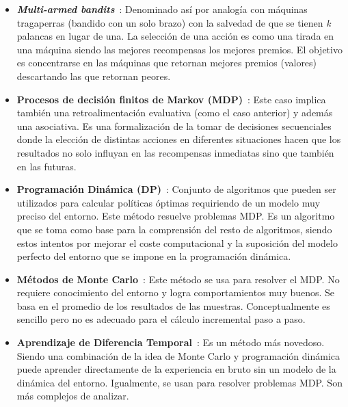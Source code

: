 \begin{itemize}
    \item \textbf{\textit{Multi-armed bandits}}~\cite{multi_armed}: Denominado así por analogía con máquinas tragaperras (bandido con un solo brazo) con la salvedad de que se tienen \textit{k} palancas en lugar de una. La selección de una acción es como una tirada en una máquina siendo las mejores recompensas los mejores premios. El objetivo es concentrarse en las máquinas que retornan mejores premios (valores) descartando las que retornan peores.\\
    
    \item \textbf{Procesos de decisión finitos de Markov (MDP)}~\cite{markov_decision_process}: Este caso implica también una retroalimentación evaluativa (como el caso anterior) y además una asociativa. Es una formalización de la tomar de decisiones secuenciales donde la elección de distintas acciones en diferentes situaciones hacen que los resultados no solo influyan en las recompensas inmediatas sino que también en las futuras.\\

    \item \textbf{Programación Dinámica (DP)}~\cite{dynamic_programming}: Conjunto de algoritmos que pueden ser utilizados para calcular políticas óptimas requiriendo de un modelo muy preciso del entorno. Este método resuelve problemas MDP. Es un algoritmo que se toma como base para la comprensión del resto de algoritmos, siendo estos intentos por mejorar el coste computacional y la suposición del modelo perfecto del entorno que se impone en la programación dinámica.\\

    \item \textbf{Métodos de Monte Carlo}~\cite{multi_armed}: Este método se usa para resolver el MDP. No requiere conocimiento del entorno y logra comportamientos muy buenos. Se basa en el promedio de los resultados de las muestras. Conceptualmente es sencillo pero no es adecuado para el cálculo incremental paso a paso.\\

    \item \textbf{Aprendizaje de Diferencia Temporal}~\cite{temporal_difference_learning}: Es un método más novedoso. Siendo una combinación de la idea de Monte Carlo y programación dinámica puede aprender directamente de la experiencia en bruto sin un modelo de la dinámica del entorno. Igualmente, se usan para resolver problemas MDP. Son más complejos de analizar.\\
\end{itemize}

